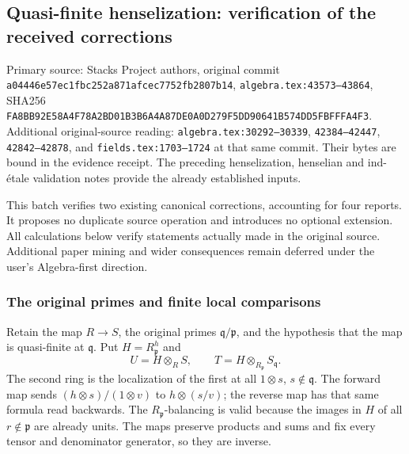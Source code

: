 \subsection{Quasi-finite henselization: verification of the received corrections}\label{algebra-proof-061-quasi-finite-henselization-verification-of-the-received-corrections}

Primary source: Stacks Project authors, original commit \texttt{a044\allowbreak{}46e5\allowbreak{}7ec1\allowbreak{}fbc2\allowbreak{}52a8\allowbreak{}71af\allowbreak{}cec7\allowbreak{}752f\allowbreak{}b280\allowbreak{}7b14}, \texttt{algebra.\AlgebraIdentifierBreak{}tex:\AlgebraIdentifierBreak{}43573–\AlgebraIdentifierBreak{}43864}, SHA256 \texttt{FA8B\allowbreak{}B92E\allowbreak{}58A4\allowbreak{}F78A\allowbreak{}2BD0\allowbreak{}1B3B\allowbreak{}6A4A\allowbreak{}87DE\allowbreak{}0A0D\allowbreak{}279F\allowbreak{}5DD9\allowbreak{}0641\allowbreak{}B574\allowbreak{}DD5F\allowbreak{}BFFF\allowbreak{}A4F3}. Additional original-source reading: \texttt{algebra.\AlgebraIdentifierBreak{}tex:\AlgebraIdentifierBreak{}30292–\AlgebraIdentifierBreak{}30339}, \texttt{42384–42447}, \texttt{42842–42878}, and \texttt{fields.\AlgebraIdentifierBreak{}tex:\AlgebraIdentifierBreak{}1703–\AlgebraIdentifierBreak{}1724} at that same commit. Their bytes are bound in the evidence receipt. The preceding henselization, henselian and ind-étale validation notes provide the already established inputs.

This batch verifies two existing canonical corrections, accounting for four reports. It proposes no duplicate source operation and introduces no optional extension. All calculations below verify statements actually made in the original source. Additional paper mining and wider consequences remain deferred under the user's Algebra-first direction.

\subsubsection{The original primes and finite local comparisons}\label{algebra-proof-061-the-original-primes-and-finite-local-comparisons}

Retain the map \(R\to S\), the original primes \(\mathfrak q/\mathfrak p\), and the hypothesis that the map is quasi-finite at \(\mathfrak q\). Put \(H=R_{\mathfrak p}^h\) and \[
 U=H\otimes_R S,\qquad
 T=H\otimes_{R_{\mathfrak p}}S_{\mathfrak q}.
\] The second ring is the localization of the first at all \(1\otimes s\), \(s\notin\mathfrak q\). The forward map sends \((h\otimes s)/(1\otimes v)\) to \(h\otimes(s/v)\); the reverse map has that same formula read backwards. The \(R_{\mathfrak p}\)-balancing is valid because the images in \(H\) of all \(r\notin\mathfrak p\) are already units. The maps preserve products and sums and fix every tensor and denominator generator, so they are inverse.

